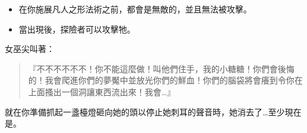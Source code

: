 \vspace*{-1em}
\begin{itemize}
  \item 在你施展凡人之形法術之前，都會是無敵的，並且無法被攻擊。
  \item 當出現後，探險者可以攻擊牠。
\end{itemize}

\begin{HauntStory}
  女巫尖叫著：
  \begin{quote}
    『不不不不不不！你不能這麼做！叫他們住手，我的小糖糖！你們會後悔的！我會爬進你們的夢魘中並放光你們的鮮血！你們的腦袋將會癢到令你在上面搔出一個洞讓東西流出來！我會…』
  \end{quote}
  就在你準備抓起一盞檯燈砸向她的頭以停止她刺耳的聲音時，她消去了…至少現在是。
\end{HauntStory}
